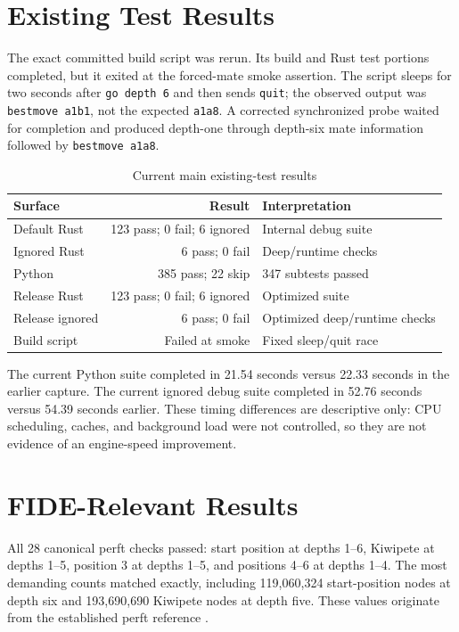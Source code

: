 \documentclass[conference]{IEEEtran}
\begin{document}
\section{Existing Test Results}
The exact committed build script was rerun. Its build and Rust test portions completed, but it exited at the forced-mate smoke assertion. The script sleeps for two seconds after \texttt{go depth 6} and then sends \texttt{quit}; the observed output was \texttt{bestmove a1b1}, not the expected \texttt{a1a8}. A corrected synchronized probe waited for completion and produced depth-one through depth-six mate information followed by \texttt{bestmove a1a8}.

\begin{table}[t]
\caption{Current main existing-test results}
\label{tab:current}
\centering
\begin{tabularx}{\columnwidth}{@{}l r X@{}}
\toprule
Surface & Result & Interpretation \\
\midrule
Default Rust & 123 pass; 0 fail; 6 ignored & Internal debug suite \\
Ignored Rust & 6 pass; 0 fail & Deep/runtime checks \\
Python & 385 pass; 22 skip & 347 subtests passed \\
Release Rust & 123 pass; 0 fail; 6 ignored & Optimized suite \\
Release ignored & 6 pass; 0 fail & Optimized deep/runtime checks \\
Build script & Failed at smoke & Fixed sleep/quit race \\
\bottomrule
\end{tabularx}
\end{table}

The current Python suite completed in 21.54 seconds versus 22.33 seconds in the earlier capture. The current ignored debug suite completed in 52.76 seconds versus 54.39 seconds earlier. These timing differences are descriptive only: CPU scheduling, caches, and background load were not controlled, so they are not evidence of an engine-speed improvement.

\section{FIDE-Relevant Results}
All 28 canonical perft checks passed: start position at depths 1--6, Kiwipete at depths 1--5, position 3 at depths 1--5, and positions 4--6 at depths 1--4. The most demanding counts matched exactly, including 119,060,324 start-position nodes at depth six and 193,690,690 Kiwipete nodes at depth five. These values originate from the established perft reference \cite{perft}.
\end{document}

